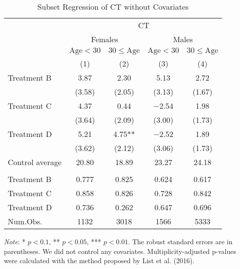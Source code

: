 \documentclass[12pt, a4paper]{article}
\begin{document}
\begin{table}[H]

\caption{\label{tab:test-lm-subset1}Subset Regression of CT without Covariates}
\centering
\fontsize{8}{10}\selectfont
\begin{threeparttable}
\begin{tabular}[t]{lcccc}
\toprule
\multicolumn{1}{c}{ } & \multicolumn{4}{c}{CT} \\
\cmidrule(l{3pt}r{3pt}){2-5}
\multicolumn{1}{c}{ } & \multicolumn{2}{c}{Females} & \multicolumn{2}{c}{Males} \\
\cmidrule(l{3pt}r{3pt}){2-3} \cmidrule(l{3pt}r{3pt}){4-5}
\multicolumn{1}{c}{ } & \multicolumn{1}{c}{$\text{Age} < 30$} & \multicolumn{1}{c}{$30 \le \text{Age}$} & \multicolumn{1}{c}{$\text{Age} < 30$} & \multicolumn{1}{c}{$30 \le \text{Age}$} \\
\cmidrule(l{3pt}r{3pt}){2-2} \cmidrule(l{3pt}r{3pt}){3-3} \cmidrule(l{3pt}r{3pt}){4-4} \cmidrule(l{3pt}r{3pt}){5-5}
  & (1) & (2) & (3) & (4)\\
\midrule
Treatment B & \num{3.87} & \num{2.30} & \num{5.13} & \num{2.72}\\
 & (\num{3.58}) & (\num{2.05}) & (\num{3.13}) & (\num{1.67})\\
Treatment C & \num{4.37} & \num{0.44} & \num{-2.54} & \num{1.98}\\
 & (\num{3.64}) & (\num{2.09}) & (\num{3.00}) & (\num{1.73})\\
Treatment D & \num{5.21} & \num{4.75}** & \num{-2.52} & \num{1.89}\\
 & (\num{3.62}) & (\num{2.12}) & (\num{3.06}) & (\num{1.73})\\
\midrule
Control average & 20.80 & 18.89 & 23.27 & 24.18\\
\addlinespace[0.3em]
\multicolumn{5}{l}{\textit{Multiplicity-adjusted p-values}}\\
\hspace{1em}Treatment B & 0.777 & 0.825 & 0.624 & 0.617\\
\hspace{1em}Treatment C & 0.858 & 0.826 & 0.728 & 0.842\\
\hspace{1em}Treatment D & 0.736 & 0.262 & 0.647 & 0.696\\
Num.Obs. & \num{1132} & \num{3018} & \num{1566} & \num{5333}\\
\bottomrule
\end{tabular}
\begin{tablenotes}
\item \emph{Note}: * $p < 0.1$, ** $p < 0.05$, *** $p < 0.01$. The robust standard errors are in parentheses. We did not control any covariates. Multiplicity-adjusted p-values were calculated with the method proposed by List et al. (2016).
\end{tablenotes}
\end{threeparttable}
\end{table}
\end{document}
